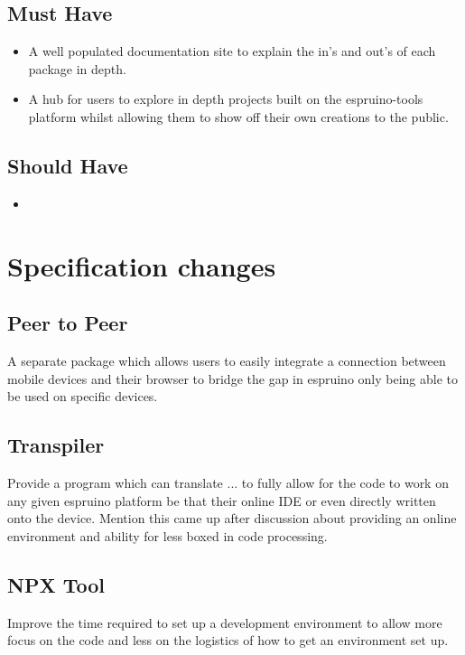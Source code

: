 \documentclass{l4proj}
\begin{document}
\subsection{Must Have}
\begin{itemize}
    \item A well populated documentation site to explain the in's and out's of each package in depth.
    \item A hub for users to explore in depth projects built on the espruino-tools platform whilst allowing them to show off their own creations to the public.
    
\end{itemize} 
\subsection{Should Have}
\begin{itemize}
    \item 
\end{itemize} 

\section{Specification changes}
\subsection{Peer to Peer}
\text A separate package which allows users to easily integrate a connection between mobile devices and their browser to bridge the gap in espruino only being able to be used on specific devices.

\subsection{Transpiler}
\text Provide a program which can translate ... to fully allow for the code to work on any given espruino platform be that their online IDE or even directly written onto the device. Mention this came up after discussion about providing an online environment and ability for less boxed in code processing.

\subsection{NPX Tool}
\text Improve the time required to set up a development environment to allow more focus on the code and less on the logistics of how to get an environment set up.
\end{document}

